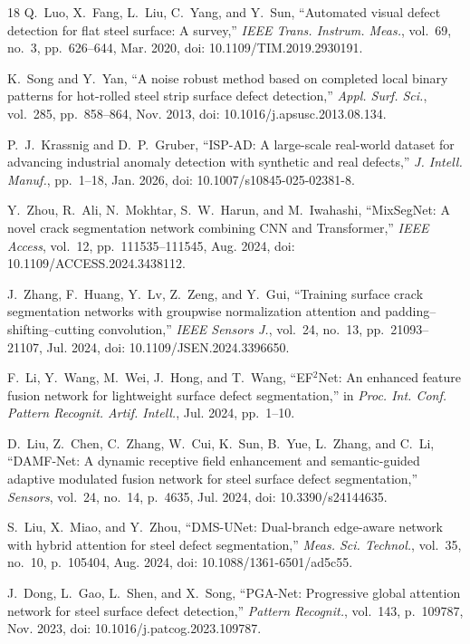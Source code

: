 \documentclass{ieeeaccess}
\begin{document}
\begin{thebibliography}{18}
Q.~Luo, X.~Fang, L.~Liu, C.~Yang, and Y.~Sun, ``Automated visual defect detection for flat steel surface: A survey,'' \emph{IEEE Trans. Instrum. Meas.}, vol.~69, no.~3, pp.~626--644, Mar. 2020, doi: 10.1109/TIM.2019.2930191.

K.~Song and Y.~Yan, ``A noise robust method based on completed local binary patterns for hot-rolled steel strip surface defect detection,'' \emph{Appl. Surf. Sci.}, vol.~285, pp.~858--864, Nov. 2013, doi: 10.1016/j.apsusc.2013.08.134.

P.~J.~Krassnig and D.~P.~Gruber, ``ISP-AD: A large-scale real-world dataset for advancing industrial anomaly detection with synthetic and real defects,'' \emph{J. Intell. Manuf.}, pp.~1--18, Jan. 2026, doi: 10.1007/s10845-025-02381-8.

Y.~Zhou, R.~Ali, N.~Mokhtar, S.~W.~Harun, and M.~Iwahashi, ``MixSegNet: A novel crack segmentation network combining CNN and Transformer,'' \emph{IEEE Access}, vol.~12, pp.~111535--111545, Aug. 2024, doi: 10.1109/ACCESS.2024.3438112.

J.~Zhang, F.~Huang, Y.~Lv, Z.~Zeng, and Y.~Gui, ``Training surface crack segmentation networks with groupwise normalization attention and padding--shifting--cutting convolution,'' \emph{IEEE Sensors J.}, vol.~24, no.~13, pp.~21093--21107, Jul. 2024, doi: 10.1109/JSEN.2024.3396650.

F.~Li, Y.~Wang, M.~Wei, J.~Hong, and T.~Wang, ``EF$^2$Net: An enhanced feature fusion network for lightweight surface defect segmentation,'' in \emph{Proc. Int. Conf. Pattern Recognit. Artif. Intell.}, Jul. 2024, pp.~1--10.

D.~Liu, Z.~Chen, C.~Zhang, W.~Cui, K.~Sun, B.~Yue, L.~Zhang, and C.~Li, ``DAMF-Net: A dynamic receptive field enhancement and semantic-guided adaptive modulated fusion network for steel surface defect segmentation,'' \emph{Sensors}, vol.~24, no.~14, p.~4635, Jul. 2024, doi: 10.3390/s24144635.

S.~Liu, X.~Miao, and Y.~Zhou, ``DMS-UNet: Dual-branch edge-aware network with hybrid attention for steel defect segmentation,'' \emph{Meas. Sci. Technol.}, vol.~35, no.~10, p.~105404, Aug. 2024, doi: 10.1088/1361-6501/ad5c55.

J.~Dong, L.~Gao, L.~Shen, and X.~Song, ``PGA-Net: Progressive global attention network for steel surface defect detection,'' \emph{Pattern Recognit.}, vol.~143, p.~109787, Nov. 2023, doi: 10.1016/j.patcog.2023.109787.


\end{thebibliography}
\end{document}

